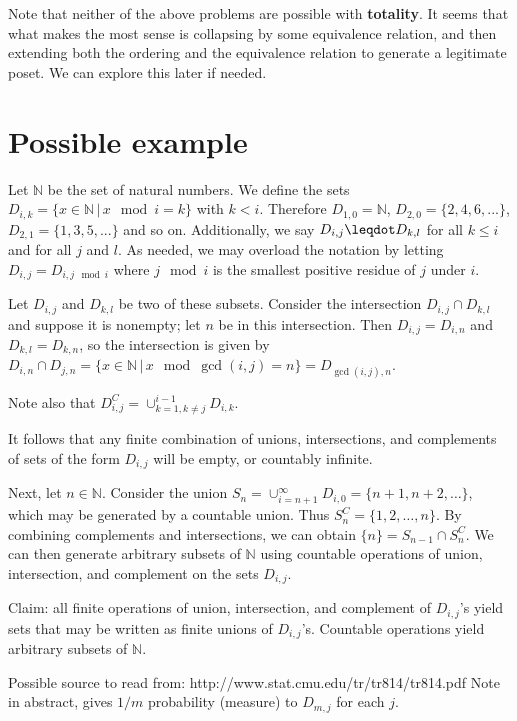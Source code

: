 \documentclass[11pt]{article}
\begin{document}
Note that neither of the above problems are possible with {\bf totality}. It seems that what makes the most sense is collapsing by some equivalence relation, and then extending both the ordering and the equivalence relation to generate a legitimate poset. We can explore this later if needed. 

\section{Possible example}

Let $\mathbb{N}$ be the set of natural numbers. We define the sets $D_{i,k} = \{ x \in \mathbb{N} \, | \, x \mod i = k \}$ with $k < i$. Therefore $D_{1,0} = \mathbb{N}$, $D_{2,0} = \{ 2, 4, 6, ... \}$, $D_{2,1} = \{ 1, 3, 5, ... \}$ and so on. Additionally, we say $D_{i,j} \finer D_{k,l}$ for all $k \leq i$ and for all $j$ and $l$. As needed, we may overload the notation by letting $D_{i,j} =  D_{i, j \mod i}$ where $j\mod i$ is the smallest positive residue of $j$ under $i$. 

Let $D_{i,j}$ and $D_{k,l}$ be two of these subsets. Consider the intersection $D_{i,j}\cap D_{k,l}$ and suppose it is nonempty; let $n$ be in this intersection. Then $D_{i,j} = D_{i,n}$ and $D_{k,l} = D_{k,n}$, so the intersection is given by $D_{i,n}\cap D_{j,n} = \{x\in \mathbb{N} \, | \, x \mod \gcd(i,j) = n\} = D_{\gcd(i,j),n}$. 

Note also that $D_{i,j}^C = \cup_{k=1,k\neq j}^{i-1}D_{i,k}$. 

It follows that any finite combination of unions, intersections, and complements of sets of the form $D_{i,j}$ will be empty, or countably infinite. 

Next, let $n\in\mathbb{N}$. Consider the union $S_n = \cup_{i=n+1}^{\infty}D_{i,0} = \{n+1,n+2,\ldots\}$, which may be generated by a countable union. Thus $S_n^C = \{1,2,\ldots,n\}$. By combining complements and intersections, we can obtain $\{n\} = S_{n-1}\cap S_n^C$. We can then generate arbitrary subsets of $\mathbb{N}$ using countable operations of union, intersection, and complement on the sets $D_{i,j}$. 

Claim: all finite operations of union, intersection, and complement of $D_{i,j}$'s yield sets that may be written as finite unions of $D_{i,j}$'s. Countable operations yield arbitrary subsets of $\mathbb{N}$. 

Possible source to read from: http://www.stat.cmu.edu/tr/tr814/tr814.pdf
Note in abstract, gives $1/m$ probability (measure) to $D_{m,j}$ for each $j$. 
\end{document}

